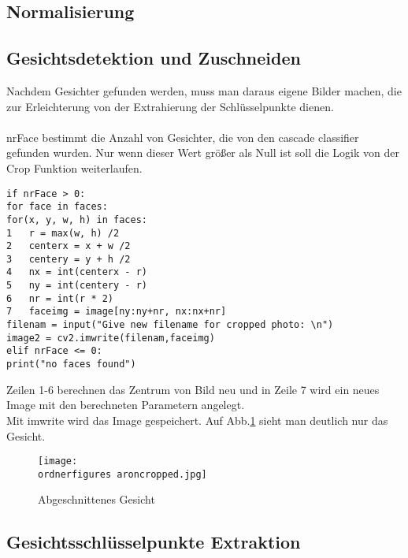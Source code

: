 \subsection{Normalisierung}


\subsection{Gesichtsdetektion und Zuschneiden}
Nachdem Gesichter gefunden werden, muss man daraus eigene Bilder machen, die zur Erleichterung von der Extrahierung der Schlüsselpunkte dienen.\\\\  
nrFace bestimmt die Anzahl von Gesichter, die von den cascade classifier gefunden wurden. 
Nur wenn dieser Wert größer als Null ist soll die Logik von der Crop Funktion weiterlaufen.  

\begin{lstlisting}
if nrFace > 0:
for face in faces:
for(x, y, w, h) in faces:
1	r = max(w, h) /2 
2	centerx = x + w /2 
3	centery = y + h /2
4	nx = int(centerx - r) 
5	ny = int(centery - r) 
6	nr = int(r * 2) 
7	faceimg = image[ny:ny+nr, nx:nx+nr] 
filenam = input("Give new filename for cropped photo: \n")
image2 = cv2.imwrite(filenam,faceimg)
elif nrFace <= 0:
print("no faces found")

\end{lstlisting}


Zeilen 1-6 berechnen das Zentrum von Bild neu und in Zeile 7 wird ein neues Image mit den berechneten Parametern angelegt.\\
Mit imwrite wird das Image gespeichert. %
Auf Abb.\ref{fig:aroncropped} sieht man deutlich nur das Gesicht. \\

\begin{figure}
	\centering
	\texttt{[image: \\ordnerfigures aroncropped.jpg]}
	\caption{ Abgeschnittenes Gesicht}
	\label{fig:aroncropped}
\end{figure}

\subsection{Gesichtsschlüsselpunkte Extraktion}


